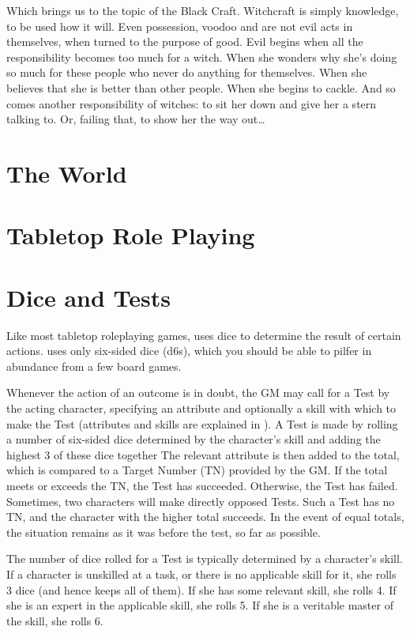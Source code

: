 Which brings us to the topic of the Black Craft.
Witchcraft is simply knowledge, to be used how it will.
Even possession, voodoo and  are not evil acts in themselves, when turned to the purpose of good. %
Evil begins when all the responsibility becomes too much for a witch.
When she wonders why she's doing so much for these people who never do anything for themselves.
When she believes that she is better than other people.
When she begins to cackle.
And so comes another responsibility of witches: to sit her down and give her a stern talking to.
Or, failing that, to show her the way out{\dots}

\section{The World}


\section{Tabletop Role Playing}

\section{Dice and Tests}

Like most tabletop roleplaying games,  uses dice to determine the result of certain actions.
 uses only six-sided dice (d6s), which you should be able to pilfer in abundance from a few board games.

Whenever the action of an outcome is in doubt, the GM may call for a Test by the acting character, specifying an attribute and optionally a skill with which to make the Test (attributes and skills are explained in ).
A Test is made by rolling a number of six-sided dice determined by the character's skill and adding the highest 3 of these dice together
The relevant attribute is then added to the total, which is compared to a Target Number (TN) provided by the GM.
If the total meets or exceeds the TN, the Test has succeeded.
Otherwise, the Test has failed.
Sometimes, two characters will make directly opposed Tests.
Such a Test has no TN, and the character with the higher total succeeds.
In the event of equal totals, the situation remains as it was before the test, so far as possible.

The number of dice rolled for a Test is typically determined by a character's skill.
If a character is unskilled at a task, or there is no applicable skill for it, she rolls 3 dice (and hence keeps all of them).
If she has some relevant skill, she rolls 4.
If she is an expert in the applicable skill, she rolls 5.
If she is a veritable master of the skill, she rolls 6.

